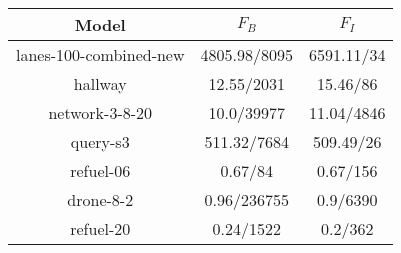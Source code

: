 \documentclass{article}
\begin{document}
\begin{table}
\begin{tabular}{|c|c|c|}
\hline

Model & $F_{B}$ & $F_{I}$ \\ \hline 

lanes-100-combined-new & 4805.98/8095 & 6591.11/34 \\ 
\hline
hallway & 12.55/2031 & 15.46/86 \\ 
\hline
network-3-8-20 & 10.0/39977 & 11.04/4846 \\ 
\hline
query-s3 & 511.32/7684 & 509.49/26 \\ 
\hline
refuel-06 & 0.67/84 & 0.67/156 \\ 
\hline
drone-8-2 & 0.96/236755 & 0.9/6390 \\ 
\hline
refuel-20 & 0.24/1522 & 0.2/362 \\ 
\hline

\end{tabular}
\end{table}
\end{document}
